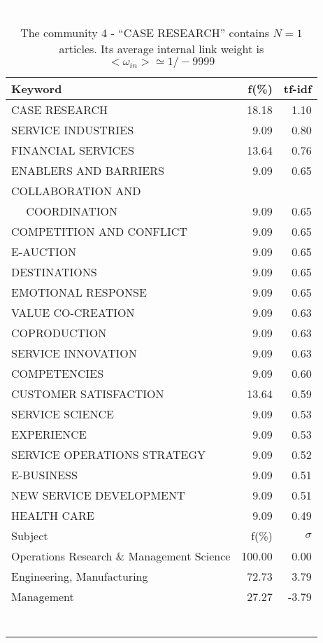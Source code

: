 \documentclass[a4paper,11pt]{report}
\begin{document}
\begin{landscape}
\begin{table}[!ht]
\caption{The community 4 - ``CASE RESEARCH'' contains $N = 1$ articles. Its average internal link weight is $<\omega_{in}> \simeq 1/-9999$ }
\textcolor{white}{aa}\\
{\scriptsize\begin{tabular}{|l r  r|}
\hline
Keyword & f(\%) & tf-idf \\
\hline
CASE RESEARCH & 18.18 & 1.10\\
SERVICE INDUSTRIES & 9.09 & 0.80\\
FINANCIAL SERVICES & 13.64 & 0.76\\
ENABLERS AND BARRIERS & 9.09 & 0.65\\
COLLABORATION AND &  &\\
$\quad$ COORDINATION & 9.09 & 0.65\\
COMPETITION AND CONFLICT & 9.09 & 0.65\\
E-AUCTION & 9.09 & 0.65\\
DESTINATIONS & 9.09 & 0.65\\
EMOTIONAL RESPONSE & 9.09 & 0.65\\
VALUE CO-CREATION & 9.09 & 0.63\\
COPRODUCTION & 9.09 & 0.63\\
SERVICE INNOVATION & 9.09 & 0.63\\
COMPETENCIES & 9.09 & 0.60\\
CUSTOMER SATISFACTION & 13.64 & 0.59\\
SERVICE SCIENCE & 9.09 & 0.53\\
EXPERIENCE & 9.09 & 0.53\\
SERVICE OPERATIONS STRATEGY & 9.09 & 0.52\\
E-BUSINESS & 9.09 & 0.51\\
NEW SERVICE DEVELOPMENT & 9.09 & 0.51\\
HEALTH CARE & 9.09 & 0.49\\
\hline
\hline
Subject & f(\%) & $\sigma$\\
\hline
Operations Research \& Management Science & 100.00 & 0.00\\
Engineering, Manufacturing & 72.73 & 3.79\\
Management & 27.27 & -3.79\\
 &  & \\
 &  & \\
 &  & \\
 &  & \\
 &  & \\
 &  & \\
 &  & \\

\end{tabular}}
\end{table}
\end{landscape}
\end{document}
